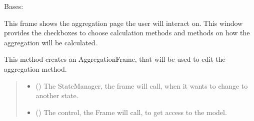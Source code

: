 \documentclass[letterpaper,10pt,english]{sphinxmanual}
\begin{document}
\begin{fulllineitems}
\label{\detokenize{apidoc/src.osm_configurator.view.toplevelframes:src.osm_configurator.view.toplevelframes.aggregation_frame.AggregationFrame}}
\pysigstartsignatures
{}
\pysigstopsignatures
\sphinxAtStartPar
Bases: {\hyperref[\detokenize{apidoc/src.osm_configurator.view.toplevelframes:src.osm_configurator.view.toplevelframes.top_level_frame.TopLevelFrame}]{}}

\sphinxAtStartPar
This frame shows the aggregation page the user will interact on.
This window provides the checkboxes to choose calculation methods and methods on how the aggregation will be calculated.

\begin{fulllineitems}
\label{\detokenize{apidoc/src.osm_configurator.view.toplevelframes:src.osm_configurator.view.toplevelframes.aggregation_frame.AggregationFrame.__init__}}
\pysigstartsignatures
{}
\pysigstopsignatures
\sphinxAtStartPar
This method creates an AggregationFrame, that will be used to edit the aggregation method.
\begin{quote}\begin{description}
\begin{itemize}
\item {} 
\sphinxAtStartPar
{} ({\hyperref[\detokenize{apidoc/src.osm_configurator.view.states:src.osm_configurator.view.states.state_manager.StateManager}]{}}) \textendash{} The StateManager, the frame will call, when it wants to change to another state.

\item {} 
\sphinxAtStartPar
{} ({\hyperref[\detokenize{apidoc/src.osm_configurator.control:src.osm_configurator.control.control_interface.IControl}]{}}) \textendash{} The control, the Frame will call, to get access to the model.


\end{itemize}
\end{description}
\end{quote}
\end{fulllineitems}
\end{fulllineitems}
\end{document}
